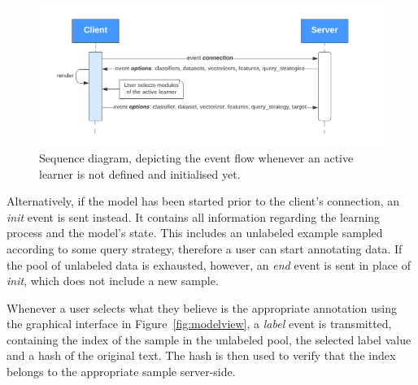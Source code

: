\documentclass[a4paper,12pt]{article}
\begin{document}
\begin{figure}[H]
\centering
    \hspace*{0.3cm}\includegraphics[scale=0.86]{options_ws.pdf}
\captionsetup{justification=centering}
\caption{\label{fig:optionsinteraction}Sequence diagram, depicting the event flow whenever an active learner is not defined and initialised yet.}
\end{figure}
Alternatively, if the model has been started prior to the client's connection, an \emph{init} event is sent instead. It contains all information regarding the learning process and the model's state. This includes an unlabeled example sampled according to some query strategy, therefore a user can start annotating data. If the pool of unlabeled data is exhausted, however, an \emph{end} event is sent in place of \emph{init}, which does not include a new sample.

Whenever a user selects what they believe is the appropriate annotation using the graphical interface in Figure~\ref{fig:modelview}, a \emph{label} event is transmitted, containing the index of the sample in the unlabeled pool, the selected label value and a hash of the original text. The hash is then used to verify that the index belongs to the appropriate sample server-side.
\end{document}
